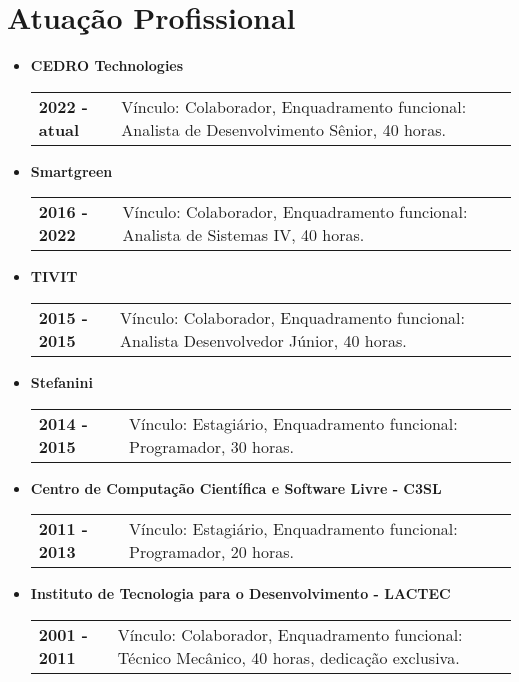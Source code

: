 \documentclass[pdftex, a4paper, 11pt]{article}
\begin{document}
\section*{Atuação Profissional}
\begin{itemize}
  \item \textbf{CEDRO Technologies}\\
  \begin{tabular}{lp{13cm}}
    \textbf{2022 - atual} & Vínculo: Colaborador, Enquadramento funcional: Analista de Desenvolvimento Sênior, 40 horas.\\
  \end{tabular}

  \item \textbf{Smartgreen}\\
  \begin{tabular}{lp{13cm}}
    \textbf{2016 - 2022} & Vínculo: Colaborador, Enquadramento funcional: Analista de Sistemas IV, 40 horas.\\
  \end{tabular}

  \item \textbf{TIVIT}\\
  \begin{tabular}{lp{13cm}}
    \textbf{2015 - 2015} & Vínculo: Colaborador, Enquadramento funcional: Analista Desenvolvedor Júnior, 40 horas.\\
  \end{tabular}

\item \textbf{Stefanini}\\
  \begin{tabular}{lp{13cm}}
    \textbf{2014 - 2015} & Vínculo: Estagiário, Enquadramento funcional: Programador, 30 horas.\\
  \end{tabular}

\item \textbf{Centro de Computação Científica e Software Livre - C3SL}\\
  \begin{tabular}{lp{13cm}}
    \textbf{2011 - 2013} & Vínculo: Estagiário, Enquadramento funcional: Programador, 20 horas.\\
  \end{tabular}

\item \textbf{Instituto de Tecnologia para o Desenvolvimento - LACTEC}\\
  \begin{tabular}{lp{13cm}}
    \textbf{2001 - 2011} & Vínculo: Colaborador, Enquadramento funcional: Técnico Mecânico, 40 horas, dedicação exclusiva.\\
  \end{tabular}
\end{itemize}
\end{document}
